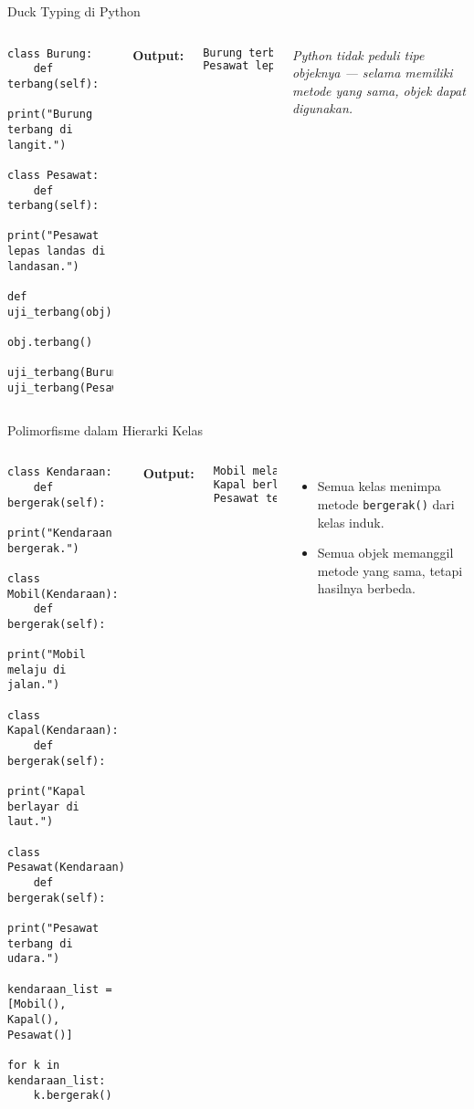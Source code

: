 \documentclass[aspectratio=169, table]{beamer}
\begin{document}
\begin{frame}[fragile]{Duck Typing di Python}
\vspace{20pt}
\begin{columns}[T]
\begin{lstlisting}[style=PythonStyle,]
class Burung:
    def terbang(self):
        print("Burung terbang di langit.")

class Pesawat:
    def terbang(self):
        print("Pesawat lepas landas di landasan.")

def uji_terbang(obj):
    obj.terbang()

uji_terbang(Burung())
uji_terbang(Pesawat())
\end{lstlisting}

\textbf{Output:}
\begin{lstlisting}[language=bash, ]
Burung terbang di langit.
Pesawat lepas landas di landasan.
\end{lstlisting}

\textit{Python tidak peduli tipe objeknya — 
selama memiliki metode yang sama, objek dapat digunakan.}
\end{columns}
\end{frame}


\begin{frame}[fragile]{Polimorfisme dalam Hierarki Kelas}
\vspace{20pt}
\begin{columns}[T]
\begin{lstlisting}[style=PythonStyle, basicstyle=\ttfamily\scriptsize]
class Kendaraan:
    def bergerak(self):
        print("Kendaraan bergerak.")

class Mobil(Kendaraan):
    def bergerak(self):
        print("Mobil melaju di jalan.")

class Kapal(Kendaraan):
    def bergerak(self):
        print("Kapal berlayar di laut.")

class Pesawat(Kendaraan):
    def bergerak(self):
        print("Pesawat terbang di udara.")

kendaraan_list = [Mobil(), Kapal(), Pesawat()]

for k in kendaraan_list:
    k.bergerak()
\end{lstlisting}

\textbf{Output:}
\begin{lstlisting}[language=bash, basicstyle=\ttfamily\small]
Mobil melaju di jalan.
Kapal berlayar di laut.
Pesawat terbang di udara.
\end{lstlisting}

\begin{itemize}
    \item Semua kelas menimpa metode \texttt{bergerak()} dari kelas induk.
    \item Semua objek memanggil metode yang sama, tetapi hasilnya berbeda.
\end{itemize}
\end{columns}
\end{frame}
\end{document}
